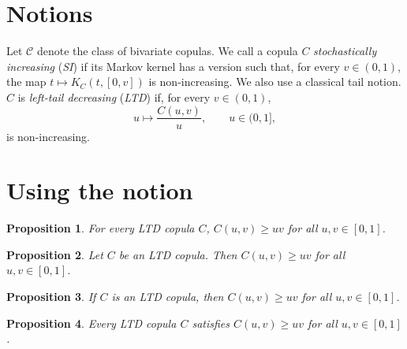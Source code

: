 \documentclass{article}
\newtheorem{proposition}{Proposition}
\newcommand{\CC}{\mathcal{C}}
\begin{document}
\section{Notions}

Let $\CC$ denote the class of bivariate copulas.
We call a copula \(C\) \emph{stochastically increasing} (\emph{SI}) if its Markov kernel has a version such that, for every \(v\in(0,1)\), the map \(t\mapsto K_C(t,[0,v])\) is non-increasing. We also use a classical tail notion. \(C\) is \emph{left-tail decreasing} (\emph{LTD}) if, for every \(v\in(0,1)\),
\begin{equation}\label{eq:ltd}
u\longmapsto\frac{C(u,v)}{u},\qquad u\in(0,1],
\end{equation}
is non-increasing.

\section{Using the notion}

\begin{proposition}
For every LTD copula $C$, $C(u,v)\ge uv$ for all $u,v\in[0,1]$.
\end{proposition}

\begin{proposition}
Let $C$ be an LTD copula. Then $C(u,v)\ge uv$ for all $u,v\in[0,1]$.
\end{proposition}

\begin{proposition}
If $C$ is an LTD copula, then $C(u,v)\ge uv$ for all $u,v\in[0,1]$.
\end{proposition}

\begin{proposition}
Every LTD copula $C$ satisfies $C(u,v)\ge uv$ for all $u,v\in[0,1]$.
\end{proposition}
\end{document}
